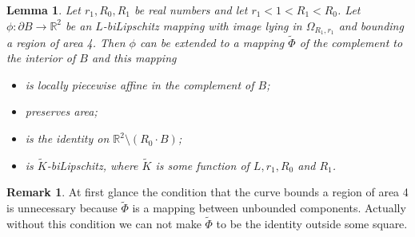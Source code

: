 \documentclass[12pt]{article}
\newtheorem{lemm}[prop]{Lemma}
\theoremstyle{definition}
\newtheorem{rema}[prop]{Remark}
\begin{document}
\begin{lemm}
\label{infinity-extension-lemma}
Let $r_1, R_0,R_1$ be real numbers  and let $r_1<1<R_1<R_0$. Let $\phi:\partial B\to\mathbb R^2$ be an $L$-biLipschitz mapping with image lying in $\Omega_{R_1,r_1}$ and bounding a region of area 4. Then $\phi$
can be extended to a mapping $\widetilde\Phi$ of the complement to the interior of $B$ and this mapping
\begin{itemize}
\item is locally piecewise affine in the complement of $B$;
\item preserves area;
\item is the identity on $\mathbb R^2\setminus \left(R_0\cdot B\right)$;
\item is $\widetilde K$-biLipschitz, where $\widetilde K$ is some function of $L,r_1,R_0$ and $R_1$.
\end{itemize}
\end{lemm}

\begin{rema}
At first glance the condition that the curve bounds a region of area 4 is unnecessary because $\widetilde\Phi$ is a mapping between unbounded components. Actually without this condition we can not make $\widetilde \Phi$ to be the identity outside some square.
\end{rema}
\end{document}
